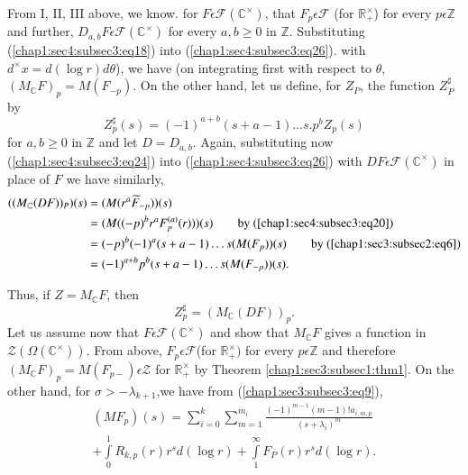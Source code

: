 From I, II, III above, we know. for $F\epsilon
\mathscr{F}(\mathbb{C}^\times)$, that $F_{p}\epsilon \mathscr{F}$ (for
$\mathbb{R}_{+}^\times$) for every $ p \epsilon \mathbb{Z}$ and further,
$D_{a,b}F\epsilon \mathscr{F}(\mathbb{C}^\times)$ for every $a,b \ge 0$
in $\mathbb{Z}$. Substituting (\ref{chap1:sec4:subsec3:eq18}) into
(\ref{chap1:sec4:subsec3:eq26}). with $d^\times x=d(\log 
r)d \theta$), we have (on integrating first with respect to
$\theta$, $(M_{\mathbb{C}}F)_p=M({F_{-p}})$. On the other hand, let us
  define, for $Z_P$, the function $Z_{P}^{\sharp}$ by
\begin{equation*}
  Z_{p}^{\sharp}(s)=(-1)^{a+b}(s+a-1)\ldots s.p^{b}Z_{p}(s)\tag{27}
  \label{chap1:sec4:subsec3:eq27} 
\end{equation*}
for $a,b\ge 0$ in $\mathbb{Z}$ and let $D=D_{a,b}$. Again,
substituting now (\ref{chap1:sec4:subsec3:eq24}) into
(\ref{chap1:sec4:subsec3:eq26}) with $DF\epsilon
\mathscr{F}(\mathbb{C}^\times)$ in place of $F$ we have similarly,
\begin{align*}
  ((M_{\mathbb{C}}(DF))_{P})(s)& =(M(r^{a}\widetilde{F}_{-p}))(s)\\
  & =(M((-p)^{b}r^{a}F_{p}^{(a)}(r)))(s)\qquad
  \text{by (\ref{chap1:sec4:subsec3:eq20})}\\ 
  &  =(-p)^{b}(-1)^{a}(s+a-1)\ldots s(M(F_{p}))(s)\qquad \text{by
    (\ref{chap1:sec3:subsec2:eq6})}\\
  & =(-1)^{a+b}p^{b}(s+a-1)\ldots s(M(F_{-p}))(s).
\end{align*}

Thus, if $Z=M_{\mathbb{C}} F$, then
\begin{equation*}
  Z_{p}^{\sharp}=(M_{\mathbb{C}}(DF))_{p}.\tag{28}\label{chap1:sec4:subsec3:eq28} 
\end{equation*}
Let us assume now that $F\epsilon \mathscr{F}(\mathbb{C}^\times)$ and show
that $M_{\mathbb{C}}F$ gives a function in
$\mathscr{Z}(\Omega(\mathbb{C}^\times))$. From above, $F_{p}\epsilon
\mathscr{F}$(for $\mathbb{R}_{+}^\times)$ for every $p\epsilon
\mathbb{Z}$ and therefore $(M_{\mathbb{C}}F)_{p}=M(F_{p-})\epsilon
\mathscr{Z}$ for $\mathbb{R}_{+}^\times$ by
Theorem \ref{chap1:sec3:subsec1:thm1}. On the other
hand, for $\sigma >-\lambda_{k+1}$,we have from
(\ref{chap1:sec3:subsec3:eq9}),
\begin{multline*}
  (MF_{p})(s)=\sum\limits_{i=0}^{k}\sum\limits_{m=1}^{m_{i}}
  \frac{(-1)^{m-1}(m-1)!a_{i,m,p}}{(s+\lambda_{i})^m}\\ 
  + \int\limits_{0}^{1}R_{k,p}(r)r^{s}d(\log r) + \int\limits_{1}^{\infty}
  F_{P}(r)r^{s}d(\log r).
\end{multline*}

